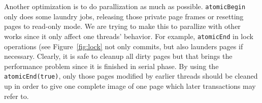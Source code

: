 Another optimization is to do parallization as much as possible. 
\texttt{atomicBegin} only does some laundry jobs, releasing those private page frames or resetting pages to read-only mode.
We are trying to make this to parallize with other works since it only affect one threads' behavior. 
For example, \texttt{atomicEnd} in lock operations (see Figure~\ref{fig:lock} 
not only commits, but also launders pages if
necessary. Clearly, it is safe to cleanup all dirty pages but that
brings the performance problem since it is finished in serial phase.
By using the \texttt{atomicEnd(true)}, only those pages modified by
earlier threads should be cleaned up in order to give one complete
image of one page which later transactions may refer to.
